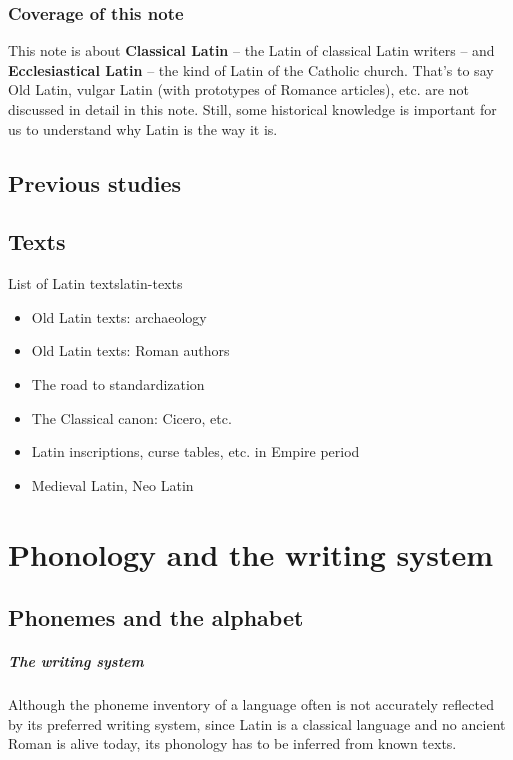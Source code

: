 \documentclass[a4paper, oneside, 12pt]{report}
\newcommand*{\concept}[1]{\textbf{#1}}
\begin{document}
\subsection{Coverage of this note}

This note is about \concept{Classical Latin} -- the Latin of classical Latin writers -- 
and \concept{Ecclesiastical Latin} -- the kind of Latin of the Catholic church.
That's to say Old Latin, vulgar Latin (with prototypes of Romance articles), etc.
are not discussed in detail in this note.
Still, some historical knowledge is important for us to understand 
why Latin is the way it is. 


\section{Previous studies}


\section{Texts}

\begin{todobox}{List of Latin texts}{latin-texts}
 \begin{itemize}
    \item Old Latin texts: archaeology
    \item Old Latin texts: Roman authors
    \item The road to standardization
    \item The Classical canon: Cicero, etc.
    \item Latin inscriptions, curse tables, etc. in Empire period
    \item Medieval Latin, Neo Latin
\end{itemize}
   
\end{todobox}

\chapter{Phonology and the writing system}

\section{Phonemes and the alphabet}

\paragraph*{The writing system}
Although the phoneme inventory of a language 
often is not accurately reflected by its preferred writing system, 
since Latin is a classical language 
and no ancient Roman is alive today, 
its phonology has to be inferred from known texts. 
\end{document}
